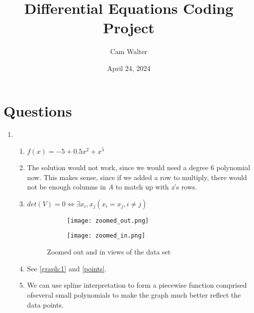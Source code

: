 \documentclass{article}
\title{Differential Equations Coding Project}
\author{Cam Walter}
\date{April 24, 2024}
\begin{document}
\maketitle

\section{Questions}
\begin{enumerate}
      \item
            \begin{enumerate}
                  \item \begin{math}
                              f(x) = -5 + 0.5x^2 + x^5
                        \end{math}
                  \item The solution would not work, since we would need a degree 6
                        polynomial now. This makes sense, since if we added a row to multiply,
                        there would not be enough columns in \textit{A} to match up with \textit{x}'s rows.
                  \item \begin{math}
                              det(V)=0 \iff \exists x_i, x_j (x_i=x_j, i \neq j)
                        \end{math}
                        \begin{figure}[h]
                              \centering
                              \begin{subfigure}{.5\textwidth}
                                    \texttt{[image: zoomed\_out.png]}
                              \end{subfigure}\hfill
                              \begin{subfigure}{.5\textwidth}
                                    \texttt{[image: zoomed\_in.png]}
                              \end{subfigure}

                              \caption{Zoomed out and in views of the data set}
                              \label{graph:1}
                        \end{figure}
                  \item See \autoref{graph:1} and \autoref{points}.
                  \item We can use spline interpretation to form a piecewise function
                        comprised ofseveral small polynomials to make the graph much better
                        reflect the data points.
            \end{enumerate}


\end{enumerate}
\end{document}
